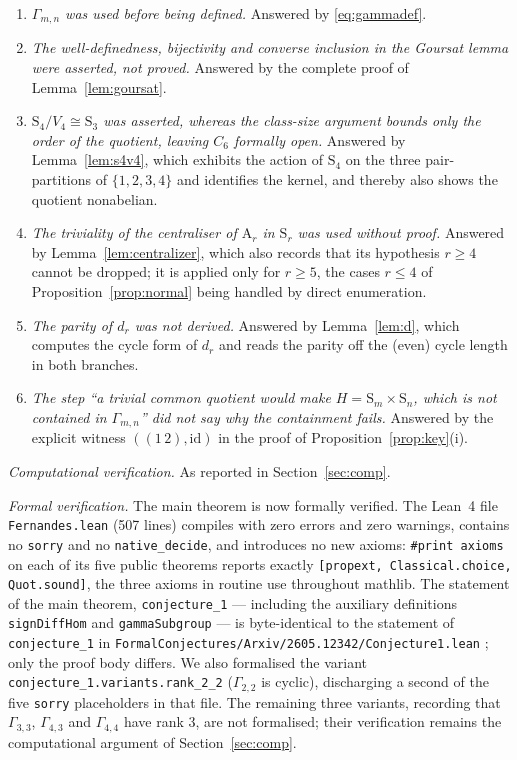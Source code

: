 \documentclass[11pt]{article}
\theoremstyle{plain}
\theoremstyle{definition}
\theoremstyle{remark}
\numberwithin{equation}{section}
\newcommand{\Sym}{\mathrm{S}}
\newcommand{\Alt}{\mathrm{A}}
\newcommand{\Gam}{\Gamma}
\begin{document}
\begin{enumerate}
\item \emph{$\Gam_{m,n}$ was used before being defined.} Answered by \eqref{eq:gammadef}.

\item \emph{The well-definedness, bijectivity and converse inclusion in the Goursat lemma were
asserted, not proved.} Answered by the complete proof of Lemma~\ref{lem:goursat}.

\item \emph{$\Sym_4/V_4 \cong \Sym_3$ was asserted, whereas the class-size argument bounds only
the order of the quotient, leaving $C_6$ formally open.} Answered by Lemma~\ref{lem:s4v4}, which
exhibits the action of $\Sym_4$ on the three pair-partitions of $\{1,2,3,4\}$ and identifies the
kernel, and thereby also shows the quotient nonabelian.

\item \emph{The triviality of the centraliser of $\Alt_r$ in $\Sym_r$ was used without proof.}
Answered by Lemma~\ref{lem:centralizer}, which also records that its hypothesis $r \ge 4$ cannot
be dropped; it is applied only for $r \ge 5$, the cases $r \le 4$ of
Proposition~\ref{prop:normal} being handled by direct enumeration.

\item \emph{The parity of $d_r$ was not derived.} Answered by Lemma~\ref{lem:d}, which computes
the cycle form of $d_r$ and reads the parity off the (even) cycle length in both branches.

\item \emph{The step ``a trivial common quotient would make $H = \Sym_m\times\Sym_n$, which is
not contained in $\Gam_{m,n}$'' did not say why the containment fails.} Answered by the explicit
witness $((1\,2),\mathrm{id})$ in the proof of Proposition~\ref{prop:key}(i).
\end{enumerate}

\emph{Computational verification.} As reported in Section~\ref{sec:comp}.

\emph{Formal verification.} The main theorem is now formally verified. The Lean~4 file
\texttt{Fernandes.lean} (507 lines) compiles with zero errors and zero warnings, contains no
\texttt{sorry} and no \texttt{native\_decide}, and introduces no new axioms: \texttt{\#print
axioms} on each of its five public theorems reports exactly \texttt{[propext, Classical.choice,
Quot.sound]}, the three axioms in routine use throughout mathlib. The statement of the main
theorem, \texttt{conjecture\_1} --- including the auxiliary definitions \texttt{signDiffHom} and
\texttt{gammaSubgroup} --- is byte-identical to the statement of \texttt{conjecture\_1} in
\texttt{FormalConjectures/Arxiv/2605.12342/Conjecture1.lean} \cite{formalconjectures}; only the
proof body differs. We also formalised the variant
\texttt{conjecture\_1.variants.rank\_2\_2} ($\Gam_{2,2}$ is cyclic), discharging a second of the
five \texttt{sorry} placeholders in that file. The remaining three variants, recording that
$\Gam_{3,3}$, $\Gam_{4,3}$ and $\Gam_{4,4}$ have rank $3$, are not formalised; their verification
remains the computational argument of Section~\ref{sec:comp}.
\end{document}
